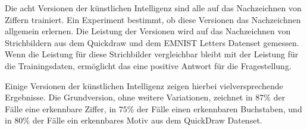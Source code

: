 Die acht Versionen der künstlichen Intelligenz sind alle auf das Nachzeichnen
von Ziffern trainiert. Ein Experiment bestimmt, ob diese Versionen das
Nachzeichnen allgemein erlernen. Die Leistung der Versionen wird auf das
Nachzeichnen von Strichbildern aus dem Quickdraw und dem EMNIST Letters Datenset
gemessen. Wenn die Leistung für diese Strichbilder vergleichbar bleibt mit der
Leistung für die Trainingsdaten, ermöglicht das eine positive Antwort für
die Fragestellung.
 
Einige Versionen der künstlichen Intelligenz zeigen hierbei vielversprechende
Ergebnisse. Die Grundversion, ohne weitere Variationen, zeichnet in $87\%$ der
Fälle eine erkennbare Ziffer, in $75\%$ der Fälle einen erkennbaren Buchstaben,
und in $80\%$ der Fälle ein erkennbares Motiv aus dem QuickDraw Datenset.